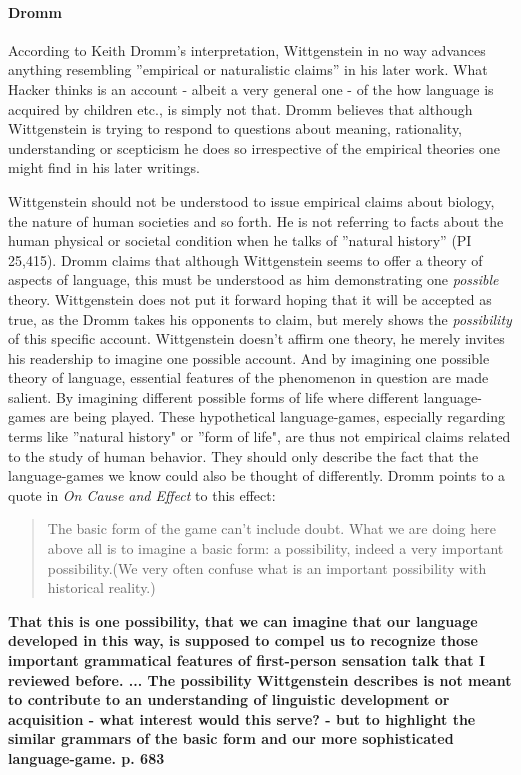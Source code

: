 \documentclass{article}
\begin{document}
\paragraph{Dromm}
According to Keith Dromm's interpretation, Wittgenstein in no way advances anything resembling ''empirical or naturalistic claims'' in his later work. What Hacker thinks is an account - albeit a very general one - of the how language is acquired by children etc., is simply not that. Dromm believes that although Wittgenstein is trying to respond to questions about meaning, rationality, understanding or scepticism he does so irrespective of the empirical theories one might find in his later writings.

Wittgenstein should not be understood to issue empirical claims about biology, the nature of human societies and so forth. He is not referring to facts about the human physical or societal condition when he talks of ''natural history'' (PI 25,415). Dromm claims that although Wittgenstein seems to offer a theory of aspects of language, this must be understood as him demonstrating one \textit{possible} theory. Wittgenstein does not put it forward hoping that it will be accepted as true, as the Dromm takes his opponents to claim, but merely shows the \textit{possibility} of this specific account. Wittgenstein doesn't affirm one theory, he merely invites his readership to imagine one possible account. And by imagining one possible theory of language, essential features of the phenomenon in question are made salient. By imagining different possible forms of life where different language-games are being played. These hypothetical language-games, especially regarding terms like ''natural history" or ''form of life", are thus not empirical claims related to the study of human behavior. They should only describe the fact that the language-games we know could also be thought of differently.
 Dromm points to a quote in \textit{On Cause and Effect} to this effect:
\begin{quote}
The basic form of the game can't include doubt. What we are doing here above all is to imagine a basic form: a possibility, indeed a very important possibility.(We very often confuse what is an important possibility with historical reality.)
\end{quote}

\textbf{That this is one possibility, that we can imagine that our language developed in this way, is supposed to compel us to recognize those important grammatical features of first-person sensation talk that I reviewed before. ... The possibility Wittgenstein describes is not meant to contribute to an understanding of linguistic development or acquisition - what interest would this serve? - but to highlight the similar grammars of the basic form and our more sophisticated language-game. p. 683}
\end{document}
